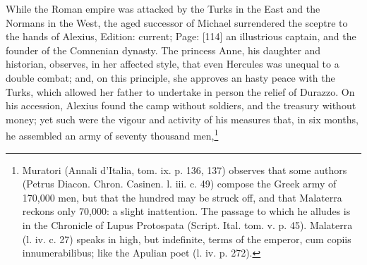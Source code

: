 While the Roman empire was attacked by the Turks in the East and the Normans in the West, the aged successor of Michael surrendered the sceptre to the hands of Alexius, Edition: current; Page: [114] an illustrious captain, and the founder of the Comnenian dynasty. The princess Anne, his daughter and historian, observes, in her affected style, that even Hercules was unequal to a double combat; and, on this principle, she approves an hasty peace with the Turks, which allowed her father to undertake in person the relief of Durazzo. On his accession, Alexius found the camp without soldiers, and the treasury without money; yet such were the vigour and activity of his measures that, in six months, he assembled an army of seventy thousand men,\footnote{Muratori (Annali d\texthebrew{}’Italia, tom. ix. p. 136, 137) observes that some authors (Petrus Diacon. Chron. Casinen. l. iii. c. 49) compose the Greek army of 170,000 men, but that the hundred may be struck off, and that Malaterra reckons only 70,000: a slight inattention. The passage to which he alludes is in the Chronicle of Lupus Protospata (Script. Ital. tom. v. p. 45). Malaterra (l. iv. c. 27) speaks in high, but indefinite, terms of the emperor, cum copiis innumerabilibus; like the Apulian poet (l. iv. p. 272).

}
